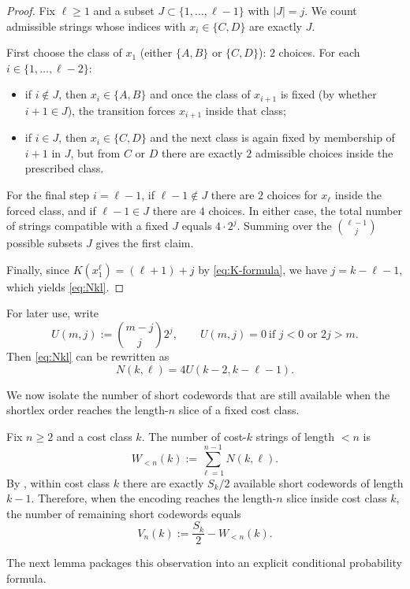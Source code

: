\documentclass[10pt,a4paper]{article}
\theoremstyle{definition}
\theoremstyle{remark}
\newcommand{\1}{\mathbf{1}}
\begin{document}
\begin{proof}
Fix $\ell\ge1$ and a subset $J\subset\{1,\dots,\ell-1\}$ with $|J|=j$. We count admissible strings whose indices with $x_i\in\{C,D\}$ are exactly $J$.

First choose the class of $x_1$ (either $\{A,B\}$ or $\{C,D\}$): $2$ choices. For each $i\in\{1,\dots,\ell-2\}$:
\begin{itemize}[leftmargin=2em]
\item if $i\notin J$, then $x_i\in\{A,B\}$ and once the class of $x_{i+1}$ is fixed (by whether $i+1\in J$), the transition forces $x_{i+1}$ inside that class;
\item if $i\in J$, then $x_i\in\{C,D\}$ and the next class is again fixed by membership of $i+1$ in $J$, but from $C$ or $D$ there are exactly $2$ admissible choices inside the prescribed class.
\end{itemize}
For the final step $i=\ell-1$, if $\ell-1\notin J$ there are $2$ choices for $x_\ell$ inside the forced class, and if $\ell-1\in J$ there are $4$ choices. In either case, the total number of strings compatible with a fixed $J$ equals $4\cdot 2^j$. Summing over the $\binom{\ell-1}{j}$ possible subsets $J$ gives the first claim.

Finally, since $K(x_1^\ell)=(\ell+1)+j$ by \eqref{eq:K-formula}, we have $j=k-\ell-1$, which yields \eqref{eq:Nkl}.
\end{proof}

For later use, write
\[
U(m,j):=\binom{m-j}{j}2^j,
\qquad
U(m,j)=0\ \text{if } j<0 \text{ or } 2j>m.
\]
Then \eqref{eq:Nkl} can be rewritten as
\[
N(k,\ell)=4U(k-2,k-\ell-1).
\]

We now isolate the number of short codewords that are still available when the shortlex order reaches the length-$n$ slice of a fixed cost class.

Fix $n\ge2$ and a cost class $k$. The number of cost-$k$ strings of length $<n$ is
\[
W_{<n}(k):=\sum_{\ell=1}^{n-1}N(k,\ell).
\]
By , within cost class $k$ there are exactly $S_k/2$ available short codewords of length $k-1$. Therefore, when the encoding reaches the length-$n$ slice inside cost class $k$, the number of remaining short codewords equals
\begin{equation}\label{eq:Vnk}
V_n(k):=\frac{S_k}{2}-W_{<n}(k).
\end{equation}

The next lemma packages this observation into an explicit conditional probability formula.
\end{document}
